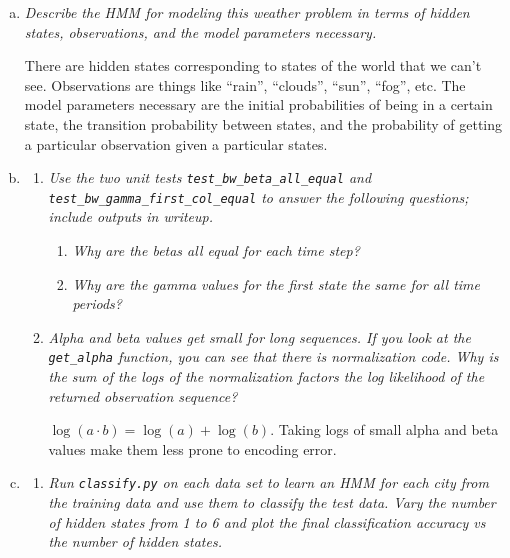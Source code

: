 \documentclass{article}
\begin{document}
\begin{enumerate}[(a)]
\item \emph{Describe the HMM for modeling this weather problem in terms of hidden
  states, observations, and the model parameters necessary.}

  There are hidden states corresponding to states of the world that we can't
  see. Observations are things like ``rain'', ``clouds'', ``sun'', ``fog'', etc. 
  The model parameters necessary are the initial probabilities of being in a
  certain state, the transition probability between states, and the probability
  of getting a particular observation given a particular states. 

\item
  \begin{enumerate}
    \setcounter{enumiii}2
  \item \emph{Use the two unit tests \emph{\texttt{test\_bw\_beta\_all\_equal}}
    and
    \emph{\texttt{test\_bw\_gamma\_first\_col\_equal}} to answer the following questions;
    include outputs in writeup.}

    \begin{enumerate}[(1)]
    \item \emph{Why are the betas all equal for each time step?}
    \item \emph{Why are the gamma values for the first state the same for all time periods?}
    \end{enumerate}

  \item \emph{Alpha and beta values get small for long sequences. If you look at the
    \emph{\texttt{get\_alpha}} function, you can see that there is normalization code.
    Why is the sum of the logs of the normalization factors the log likelihood of
    the returned observation sequence?}

    $\log(a\cdot b)=\log(a)+\log(b)$. Taking logs of small alpha and beta values
    make them less prone to encoding error.

  \end{enumerate}

\item
  \begin{enumerate}
  \item \emph{Run \texttt{\emph{classify.py}} on each data set to learn an HMM
    for each city from the training data and use them to classify the test data.
    Vary the number of hidden states from 1 to 6 and plot the final classification
    accuracy vs the number of hidden states.}


\end{enumerate}
\end{enumerate}
\end{document}
